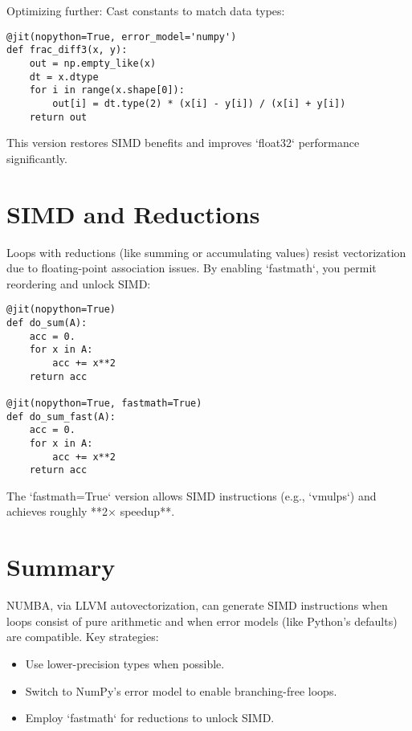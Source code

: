 \documentclass{book}
\begin{document}
Optimizing further: Cast constants to match data types:

\begin{lstlisting}
@jit(nopython=True, error_model='numpy')
def frac_diff3(x, y):
    out = np.empty_like(x)
    dt = x.dtype
    for i in range(x.shape[0]):
        out[i] = dt.type(2) * (x[i] - y[i]) / (x[i] + y[i])
    return out
\end{lstlisting}

This version restores SIMD benefits and improves `float32` performance significantly.

\section{SIMD and Reductions}

Loops with reductions (like summing or accumulating values) resist vectorization due to floating-point association issues. By enabling `fastmath`, you permit reordering and unlock SIMD:

\begin{lstlisting}
@jit(nopython=True)
def do_sum(A):
    acc = 0.
    for x in A:
        acc += x**2
    return acc

@jit(nopython=True, fastmath=True)
def do_sum_fast(A):
    acc = 0.
    for x in A:
        acc += x**2
    return acc
\end{lstlisting}

The `fastmath=True` version allows SIMD instructions (e.g., `vmulps`) and achieves roughly **2× speedup**.

\section*{Summary}

NUMBA, via LLVM autovectorization, can generate SIMD instructions when loops consist of pure arithmetic and when error models (like Python's defaults) are compatible. Key strategies:
\begin{itemize}
  \item Use lower-precision types when possible.
  \item Switch to NumPy’s error model to enable branching-free loops.
  \item Employ `fastmath` for reductions to unlock SIMD.
\end{itemize}
\end{document}
